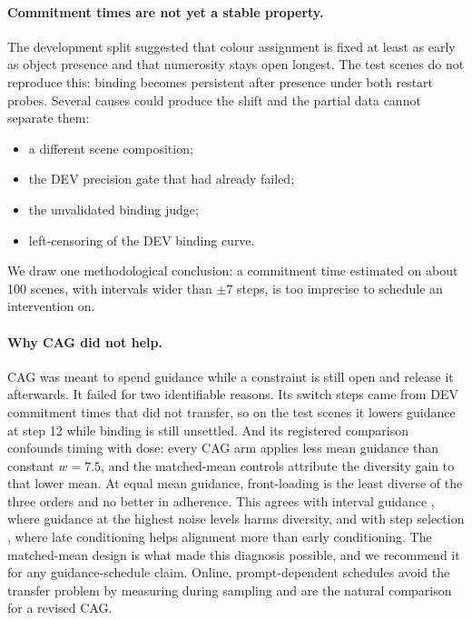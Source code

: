 \paragraph{Commitment times are not yet a stable property.} The development split suggested that colour assignment is fixed at least as early as object presence and that numerosity stays open longest. The test scenes do not reproduce this: binding becomes persistent after presence under both restart probes. Several causes could produce the shift and the partial data cannot separate them:
\begin{itemize}
\item a different scene composition;
\item the DEV precision gate that had already failed;
\item the unvalidated binding judge;
\item left-censoring of the DEV binding curve.
\end{itemize}
We draw one methodological conclusion: a commitment time estimated on about 100 scenes, with intervals wider than $\pm7$ steps, is too imprecise to schedule an intervention on.

\paragraph{Why CAG did not help.} CAG was meant to spend guidance while a constraint is still open and release it afterwards. It failed for two identifiable reasons. Its switch steps came from DEV commitment times that did not transfer, so on the test scenes it lowers guidance at step 12 while binding is still unsettled. And its registered comparison confounds timing with dose: every CAG arm applies less mean guidance than constant $w=7.5$, and the matched-mean controls attribute the diversity gain to that lower mean. At equal mean guidance, front-loading is the least diverse of the three orders and no better in adherence. This agrees with interval guidance \citep{kynkaanniemi2024interval}, where guidance at the highest noise levels harms diversity, and with step selection \citep{grimal2025step}, where late conditioning helps alignment more than early conditioning. The matched-mean design is what made this diagnosis possible, and we recommend it for any guidance-schedule claim. Online, prompt-dependent schedules \citep{dynamiccfg2025} avoid the transfer problem by measuring during sampling and are the natural comparison for a revised CAG.


